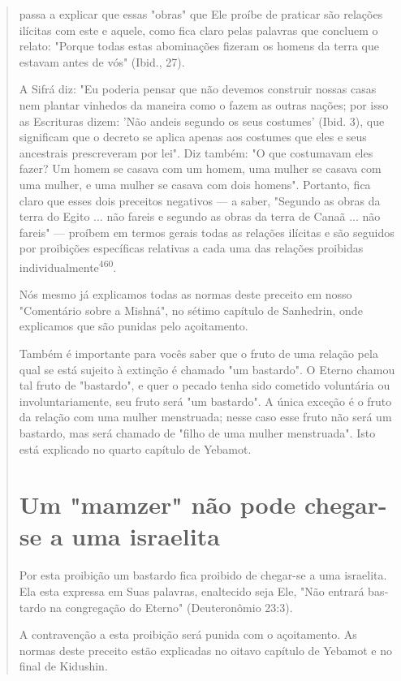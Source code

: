 \begin{quote}

passa a explicar que essas "obras" que Ele proíbe de praticar são
relações ilíci­tas com este e aquele, como fica claro pelas palavras que
concluem o relato: "Porque todas estas abominações fizeram os homens da
terra que estavam an­tes de vós" (Ibid., 27).

A Sifrá diz: "Eu poderia pensar que não devemos construir nossas casas
nem plantar vinhedos da maneira como o fazem as outras nações; por isso
as Escrituras dizem: 'Não andeis segundo os seus costumes' (Ibid. 3),
que significam que o decreto se aplica apenas aos costumes que eles e
seus ances­trais prescreveram por lei". Diz também: "O que costumavam
eles fazer? Um homem se casava com um homem, uma mulher se casava com
uma mulher, e uma mulher se casava com dois homens". Portanto, fica
claro que esses dois preceitos negativos --- a saber, "Segundo as obras
da terra do Egito ... não fa­reis e segundo as obras da terra de Canaã
... não fareis" --- proíbem em termos gerais todas as relações ilícitas
e são seguidos por proibições específicas relati­vas a cada uma das
relações proibidas individualmente\textsuperscript{460}.

Nós mesmo já explicamos todas as normas deste preceito em nosso
"Comentário sobre a Mishná", no sétimo capítulo de Sanhedrin, onde
explica­mos que são punidas pelo açoitamento.

Também é importante para vocês saber que o fruto de uma relação pela
qual se está sujeito à extinção é chamado "um bastardo". O Eterno
cha­mou tal fruto de "bastardo", e quer o pecado tenha sido cometido
voluntária ou involuntariamente, seu fruto será "um bastardo". A única
exceção é o fruto da relação com uma mulher menstruada; nesse caso esse
fruto não será um bas­tardo, mas será chamado de "filho de uma mulher
menstruada". Isto está ex­plicado no quarto capítulo de Yebamot.

\section{Um "mamzer" não pode chegar-se a uma israelita}

Por esta proibição um bastardo fica proibido de chegar-se a uma
is­raelita. Ela esta expressa em Suas palavras, enaltecido seja Ele,
"Não entrará bas­tardo na congregação do Eterno" (Deuteronômio 23:3).

A contravenção a esta proibição será punida com o açoitamento. As normas
deste preceito estão explicadas no oitavo capítulo de Ye­bamot e no
final de Kidushin.


\end{quote}
